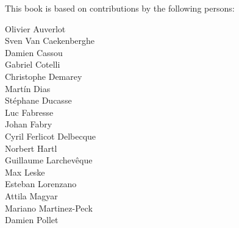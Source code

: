 \documentclass[11pt,english]{../support/latex/sbabook/sbabook}
\begin{document}
This book is based on contributions by the following persons:

\small

\begin{multicols}{3}
Olivier Auverlot\\
Sven Van Caekenberghe\\
Damien Cassou\\
Gabriel Cotelli\\
Christophe Demarey\\
Martín Dias\\
Stéphane Ducasse\\
Luc Fabresse\\
Johan Fabry\\
Cyril Ferlicot Delbecque\\
Norbert Hartl\\
Guillaume Larchevêque\\
Max Leske\\
Esteban Lorenzano\\
Attila Magyar\\
Mariano Martinez-Peck\\
Damien Pollet\\
\end{multicols}
\end{document}
